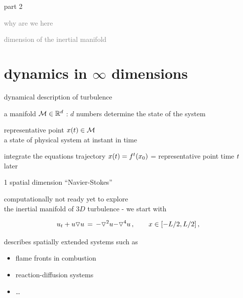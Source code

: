\begin{frame}{part 2}
\begin{enumerate}
              \item
    \textcolor{gray}{\small
why are we here
        }
              \item
    {\Large
\statesp
    }\textcolor{gray}{\small
              \item
dimension of the inertial manifold
                    }
            \end{enumerate}
\end{frame}


\section[dynamics in $\infty$ dimensions]
{dynamics in $\infty$ dimensions}

\begin{frame}{dynamical description of turbulence}

\begin{block}{\statesp}
a manifold $\pS \in \reals^{d}$ :
$d$ numbers determine the state of the system
\end{block}

\bigskip

\begin{block}{representative point }
$\ssp(t) \in \pS$
\\
a state of physical system at instant in time
\end{block}

\bigskip

\begin{block}{integrate the equations}
trajectory $\ssp(\zeit) = \flow{\zeit}{\xInit}$ =
representative point time $\zeit$ later
\end{block}
\end{frame}

\begin{frame}{1 spatial dimension ``Navier-Stokes''}

computationally not ready yet to explore \\
the inertial manifold of $3D$ turbulence - we start with

\bigskip

\begin{block}{\KSe}
\[
  u_t + u \triangledown u \,=\,
    {\color{red}-}\triangledown^2 u {\color{red}-\triangledown^4 u}
    \,,\qquad   x \in [-L/2,L/2]
    \,,
\]
\end{block}

\bigskip

describes spatially extended systems such as
\begin{itemize}
 \item flame fronts in combustion
 \item reaction-diffusion systems
 \item \ldots
\end{itemize}

\end{frame}


